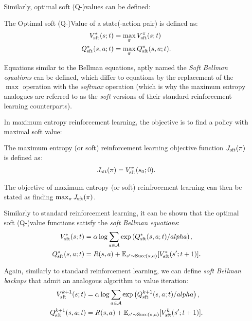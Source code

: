         Similarly, optimal soft (Q-)values can be defined:
        \begin{defn}
            \label{def:optimal_sft_value}
            \label{def:optimal_sft_q_value}
            The \textnormal{Optimal soft (Q-)Value} of a state(-action pair) is defined as:
            \begin{align}
                V_{{\textnormal{sft}}}^*(s;t) &= \max_{\pi} V_{{\textnormal{sft}}}^{\pi}(s;t) \\
                Q_{{\textnormal{sft}}}^*(s,a;t) &= \max_{\pi} Q_{{\textnormal{sft}}}^{\pi}(s,a;t).
            \end{align}
        \end{defn}

        Equations similar to the Bellman equations, aptly named the \textit{Soft Bellman equations} can be defined, which differ to equations  by the replacement of the $\max$ operation with the \textit{softmax} operation (which is why the maximum entropy analogues are referred to as the \textit{soft} versions of their standard reinforcement learning counterparts).

        In maximum entropy reinforcement learning, the objective is to find a policy with maximal soft value:
        \begin{defn}
            The \textnormal{maximum entropy (or soft) reinforcement learning objective function} $J_{{\textnormal{sft}}}(\pi)$ is defined as:
            \begin{align}
                J_{{\textnormal{sft}}}(\pi) = V_{{\textnormal{sft}}}^{\pi}(s_0;0).
            \end{align}

            The objective of maximum entropy (or soft) reinfrocement learning can then be stated as finding $\max_{\pi} J_{{\textnormal{sft}}}(\pi)$.
        \end{defn}

        Similarly to standard reinforcement learning, it can be shown  that the optimal soft (Q-)value functions satisfy the \textit{soft Bellman equations}:
        \begin{align}
            V_{{\textnormal{sft}}}^*(s;t) &= \alpha \log \sum_{a\in\mathcal{A}} \exp\left( Q_{{\textnormal{sft}}}^*(s,a;t) / alpha \right), \\
            Q_{{\textnormal{sft}}}^*(s,a;t) &= R(s,a) + \mathbb{E}_{s'\sim {\textnormal{Succ}(s,a)}} [V_{{\textnormal{sft}}}^*(s';t+1)].
        \end{align} 

        Again, similarly to standard reinforcement learning, we can define \textit{soft Bellman backups} that admit an analogous algorithm to value iteration:
        \begin{align}
            V_{{\textnormal{sft}}}^{k+1}(s;t) &= \alpha \log \sum_{a\in\mathcal{A}} \exp\left( Q_{{\textnormal{sft}}}^{k+1}(s,a;t) / alpha \right), \\
            Q_{{\textnormal{sft}}}^{k+1}(s,a;t) &= R(s,a) + \mathbb{E}_{s'\sim {\textnormal{Succ}(s,a)}} [V_{{\textnormal{sft}}}^k(s';t+1)].
        \end{align}

